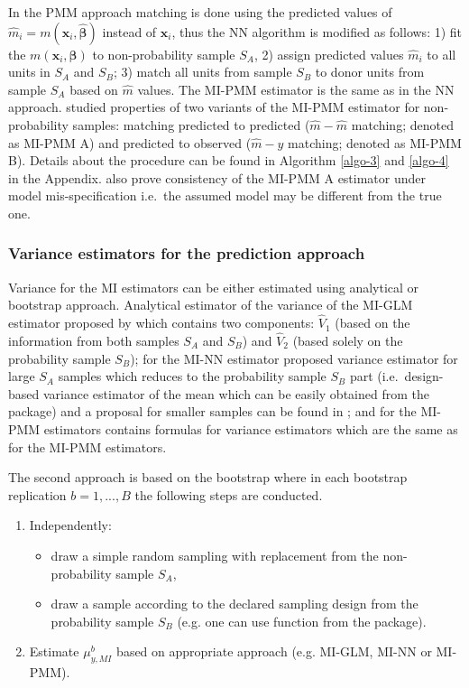 \documentclass[
]{jss}
\begin{document}
In the PMM approach matching is done using the predicted values of
\(\hat{m}_i=m\left(\boldsymbol{x}_i, \hat{\boldsymbol{\beta}}\right)\)
instead of \(\boldsymbol{x}_i\), thus the NN algorithm is modified as
follows: 1) fit the
\(m\left(\boldsymbol{x}_i, \boldsymbol{\beta}\right)\) to
non-probability sample \(S_A\), 2) assign predicted values \(\hat{m}_i\)
to all units in \(S_A\) and \(S_B\); 3) match all units from sample
\(S_B\) to donor units from sample \(S_A\) based on \(\hat{m}\) values.
The MI-PMM estimator is the same as in the NN approach.
\citet{chlebicki2025} studied properties of two variants of the MI-PMM
estimator for non-probability samples: matching predicted to predicted
(\(\hat{m}-\hat{m}\) matching; denoted as MI-PMM A) and predicted to
observed (\(\hat{m}-y\) matching; denoted as MI-PMM B). Details about
the procedure can be found in Algorithm \ref{algo-3} and \ref{algo-4} in
the Appendix. \citet{chlebicki2025} also prove consistency of the MI-PMM
A estimator under model mis-specification i.e.~the assumed model may be
different from the true one.

\subsubsection{Variance estimators for the prediction
approach}\label{variance-estimators-for-the-prediction-approach}

Variance for the MI estimators can be either estimated using analytical
or bootstrap approach. Analytical estimator of the variance of the
MI-GLM estimator proposed by \citet[p. 950]{kim_combining_2021} which
contains two components: \(\hat{V}_1\) (based on the information from
both samples \(S_A\) and \(S_B\)) and \(\hat{V}_2\) (based solely on the
probability sample \(S_B\)); for the MI-NN estimator
\citet{yang2021integration} proposed variance estimator for large
\(S_A\) samples which reduces to the probability sample \(S_B\) part
(i.e.~design-based variance estimator of the mean which can be easily
obtained from the  package) and a proposal for smaller
samples can be found in \citet{chlebicki2025}; and for the MI-PMM
estimators \citet{chlebicki2025} contains formulas for variance
estimators which are the same as for the MI-PMM estimators.

The second approach is based on the bootstrap where in each bootstrap
replication \(b=1,...,B\) the following steps are conducted.

\begin{enumerate}
\item Independently:
  \begin{itemize}
  \item draw a simple random sampling with replacement from the non-probability sample $S_A$,
  \item draw a sample according to the declared sampling design from the probability sample $S_B$ (e.g. one can use  function from the  package).
  \end{itemize}
\item Estimate $\mu_{y, MI}^b$ based on appropriate approach (e.g. MI-GLM, MI-NN or MI-PMM).
\end{enumerate}
\end{document}
